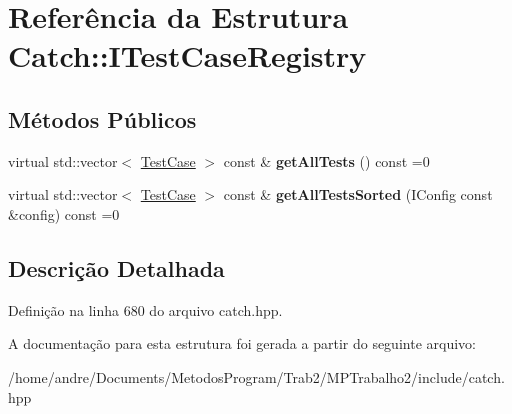 \hypertarget{structCatch_1_1ITestCaseRegistry}{}\section{Referência da Estrutura Catch\+:\+:I\+Test\+Case\+Registry}
\label{structCatch_1_1ITestCaseRegistry}
\subsection*{Métodos Públicos}
\begin{DoxyCompactItemize}
\item 
virtual std\+::vector$<$ \hyperlink{classCatch_1_1TestCase}{Test\+Case} $>$ const \& {\bfseries get\+All\+Tests} () const =0\hypertarget{structCatch_1_1ITestCaseRegistry_ad6e4d4a621655123f73ae98cfeda063d}{}\label{structCatch_1_1ITestCaseRegistry_ad6e4d4a621655123f73ae98cfeda063d}

\item 
virtual std\+::vector$<$ \hyperlink{classCatch_1_1TestCase}{Test\+Case} $>$ const \& {\bfseries get\+All\+Tests\+Sorted} (I\+Config const \&config) const =0\hypertarget{structCatch_1_1ITestCaseRegistry_a33e46639d0319d35497c05bb5d02be5a}{}\label{structCatch_1_1ITestCaseRegistry_a33e46639d0319d35497c05bb5d02be5a}

\end{DoxyCompactItemize}


\subsection{Descrição Detalhada}


Definição na linha 680 do arquivo catch.\+hpp.



A documentação para esta estrutura foi gerada a partir do seguinte arquivo\+:\begin{DoxyCompactItemize}
\item 
/home/andre/\+Documents/\+Metodos\+Program/\+Trab2/\+M\+P\+Trabalho2/include/catch.\+hpp\end{DoxyCompactItemize}
